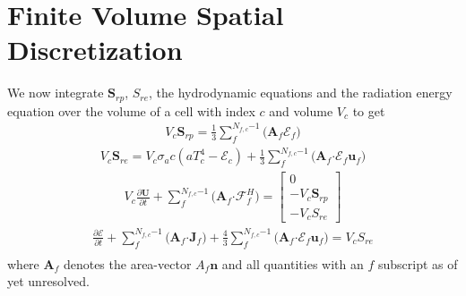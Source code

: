 \documentclass[10pt,letterpaper,notitlepage]{article}
\numberwithin{equation}{section}
\newcommand{\partialderiv}[2]{\frac{\partial #1}{\partial #2}}
\newcommand{\velocity}{\mathbf{u}}
\newcommand{\dotp}{\boldsymbol{\cdot}}
\newcommand{\RadE}{\mathcal{E}}
\newcommand{\HydroF}{\mathcal{F}^H}
\newcommand{\HydroU}{\mathbf{U}}
\newcommand{\RadJ}{\mathbf{J}}
\newcommand{\SumOverCellFaces}{\sum_f^{N_{f,c}{-1}}}
\newcommand{\AreaVec}{\mathbf{A}}
\newcommand{\beqn}{\begin{equation}\begin{aligned}}
\newcommand{\eeqn}{\end{aligned}\end{equation}}
\begin{document}
\newpage
\section{Finite Volume Spatial Discretization}
We now integrate $\mathbf{S}_{rp}$, $S_{re}$, the hydrodynamic equations and the radiation energy equation over the volume of a cell with index $c$ and volume $V_c$ to get
\beqn 
V_c \mathbf{S}_{rp} = \frac{1}{3} \SumOverCellFaces \biggr( \AreaVec_f \RadE_f \biggr)
\eeqn 
\beqn 
V_c \mathbf{S}_{re} = V_c \sigma_a c (a T_c^4 - \RadE_c) 
+ \frac{1}{3} \SumOverCellFaces \biggr(\AreaVec_f \dotp \RadE_f \velocity_f \biggr)
\eeqn 
\beqn 
V_c\partialderiv{\HydroU}{t} + \SumOverCellFaces \biggr( \AreaVec_f \dotp \HydroF_f \biggr) = 
\begin{bmatrix}
	0 \\
	-V_c \mathbf{S}_{rp} \\
	-V_c S_{re} 
\end{bmatrix}
\eeqn 
\beqn 
\frac{\partial \RadE}{\partial t} 
+\SumOverCellFaces \biggr( \AreaVec_f \dotp \RadJ_f \biggr) + \frac{4}{3} \SumOverCellFaces \biggr( \AreaVec_f \dotp \RadE_f \velocity_f \biggr) = V_c S_{re}\\
\eeqn
where $\AreaVec_f$ denotes the area-vector $A_f \mathbf{n}$ and all quantities with an $f$ subscript as of yet unresolved. 
\end{document}
